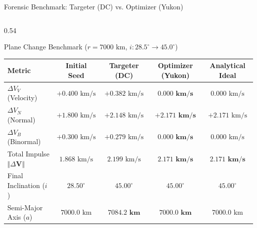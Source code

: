 \documentclass[aspectratio=169, 10pt]{beamer}
\begin{document}
\begin{frame}{Forensic Benchmark: Targeter (DC) vs. Optimizer (Yukon)}
    \begin{columns}[t]
        \begin{column}{0.54\textwidth}
            \begin{block}{Plane Change Benchmark ($r = 7000\text{ km}$, $i: 28.5^\circ \to 45.0^\circ$)}
                \centering
                \fontsize{5.0pt}{6.0pt}\selectfont
                \setlength{\tabcolsep}{1.8pt}
                \begin{tabular}{lcccc}
                    \toprule
                    \textbf{Metric} & \textbf{Initial Seed} & \textbf{Targeter (DC)} & \textbf{Optimizer (Yukon)} & \textbf{Analytical Ideal} \\ \midrule
                    $\Delta V_V$ (Velocity)   & $+0.400\text{ km/s}$  & $+0.382\text{ km/s}$  & $\mathbf{0.000\text{ km/s}}$  & $0.000\text{ km/s}$ \\
                    $\Delta V_N$ (Normal)     & $+1.800\text{ km/s}$  & $+2.148\text{ km/s}$  & $\mathbf{+2.171\text{ km/s}}$ & $+2.171\text{ km/s}$ \\
                    $\Delta V_B$ (Binormal)   & $+0.300\text{ km/s}$  & $+0.279\text{ km/s}$  & $\mathbf{0.000\text{ km/s}}$  & $0.000\text{ km/s}$ \\
                    Total Impulse $\Vert{}\Delta \mathbf{V}\Vert{}$ & $1.868\text{ km/s}$ & $2.199\text{ km/s}$ & $\mathbf{2.171\text{ km/s}}$ & $\mathbf{2.171\text{ km/s}}$ \\
                    Final Inclination ($i$)   & $28.50^\circ$         & $45.00^\circ$         & $45.00^\circ$                 & $45.00^\circ$ \\
                    Semi-Major Axis ($a$)     & $7000.0\text{ km}$    & $\mathbf{7084.2\text{ km}}$ & $\mathbf{7000.0\text{ km}}$ & $7000.0\text{ km}$ \\ \bottomrule
                \end{tabular}
            \end{block}

            \vspace{-0.08cm}


\end{column}
\end{columns}
\end{frame}
\end{document}
